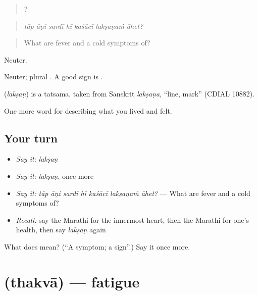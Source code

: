 \begin{quote}
      ?
\end{quote}

\begin{quote}
\emph{tāp āṇi sardī hī kaśācī lakṣaṇaṁ āhet?}
\end{quote}

\begin{quote}
What are fever and a cold symptoms of?
\end{quote}

Neuter.

Neuter; plural . A good sign is  .

\begin{cousinweb}
\textbf{} (\emph{lakṣaṇ}) is a tatsama, taken from Sanskrit \emph{lakṣaṇa}, \textquotedblleft{}line, mark\textquotedblright{} (CDIAL 10882).
\end{cousinweb}

\begin{grammarlens}[title={What you've built}]
One more word for describing what you lived and felt.
\end{grammarlens}

\subsection*{Your turn}
\begin{itemize}
\raggedright
  \item \emph{Say it:} \emph{lakṣaṇ}
  \item \emph{Say it:} \emph{lakṣaṇ}, once more
  \item \emph{Say it:} \emph{tāp āṇi sardī hī kaśācī lakṣaṇaṁ āhet?} — What are fever and a cold symptoms of?
  \item \emph{Recall:} say the Marathi for the innermost heart, then the Marathi for one's health, then say \emph{lakṣaṇ} again
\end{itemize}

\begin{tcolorbox}[breakable,colback=teal!4,colframe=teal!35!black,title={Before you move on}]
What does  mean? (\textquotedblleft{}A symptom; a sign\textquotedblright{}.) Say it once more.
\end{tcolorbox}
\section[\texorpdfstring{\mr{थकवा} (thakvā)}{थकवा (thakvā)}]{ (thakvā) — fatigue}

